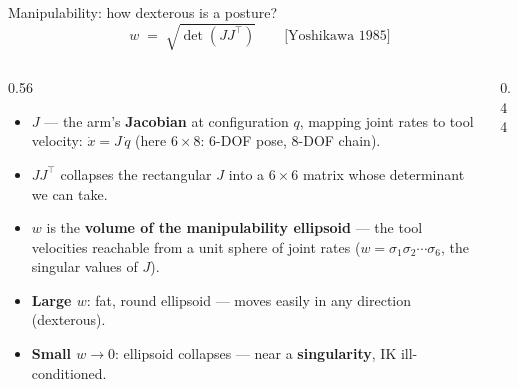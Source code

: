 \begin{frame}{Manipulability: how dexterous is a posture?}
  \begin{equation*}
    w \;=\; \sqrt{\det\!\left(J J^{\top}\right)}
    \qquad\text{[Yoshikawa 1985]}
  \end{equation*}
  \vspace{-0.3em}
  \begin{columns}[T]
    \begin{column}{0.56\textwidth}
      \footnotesize
      \begin{itemize}
        \item $J$ --- the arm's \textbf{Jacobian} at configuration $q$, mapping
              joint rates to tool velocity: $\dot{x} = J\,\dot{q}$
              (here $6\times 8$: 6-DOF pose, 8-DOF chain).
        \item $J J^{\top}$ collapses the rectangular $J$ into a $6\times6$ matrix
              whose determinant we can take.
        \item $w$ is the \textbf{volume of the manipulability ellipsoid} ---
              the tool velocities reachable from a unit sphere of joint rates
              ($w=\sigma_1\sigma_2\cdots\sigma_6$, the singular values of $J$).
      \end{itemize}
      \vspace{0.3em}
      \begin{itemize}
        \item[\textcolor{red!70!black}{$\blacksquare$}] \textbf{Large $w$}: fat, round
              ellipsoid --- moves easily in any direction (dexterous).
        \item[\textcolor{blue!70!black}{$\blacksquare$}] \textbf{Small $w\!\to\!0$}:
              ellipsoid collapses --- near a \textbf{singularity}, IK ill-conditioned.
      \end{itemize}
    \end{column}
    \begin{column}{0.44\textwidth}
      \centering
\end{column}
\end{columns}
\end{frame}
